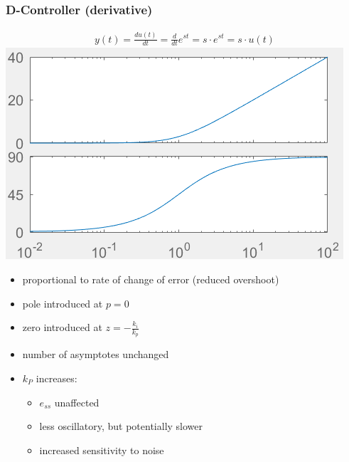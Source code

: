     \subsubsection{D-Controller (derivative)}
            \begin{align*}
                y(t) = \frac{d u(t)}{dt} = \frac{d}{dt} e^{st} = s \cdot e^{st} = s \cdot u(t)
            \end{align*}
            \includegraphics[width = \linewidth]{src/images/PD-controller.png}
        \begin{itemize}
            \item proportional to rate of change of error (reduced overshoot)
            \item pole introduced at $p=0$
            \item zero introduced at $z = -\frac{k_i}{k_p}$
            \item number of asymptotes unchanged
            \item $k_P$ increases:
            \begin{itemize}
                \item $e_{ss}$ unaffected
                \item less oscillatory, but potentially slower
                \item increased sensitivity to noise
            \end{itemize}
        \end{itemize}

